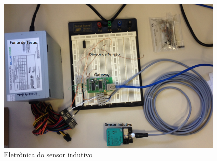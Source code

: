 \begin{figure}[h!]
 \centering
 \includegraphics[width=1\columnwidth]{indutivo/figs/indutivo_bancada.png}
 \caption{Eletrônica do sensor indutivo}
 \label{fig:indu_banc}
 \end{figure}


 

\label{metodos}


